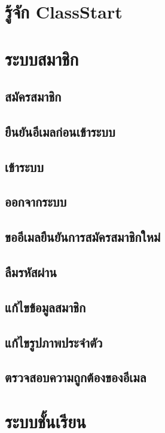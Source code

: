 \documentclass[12pt,oneside]{book}
\begin{document}
\tableofcontents

\chapter{รู้จัก ClassStart}

\chapter{ระบบสมาชิก}

\section{สมัครสมาชิก}

\section{ยืนยันอีเมลก่อนเข้าระบบ}

\section{เข้าระบบ}

\section{ออกจากระบบ}

\section{ขออีเมลยืนยันการสมัครสมาชิกใหม่}

\section{ลืมรหัสผ่าน}

\section{แก้ไขข้อมูลสมาชิก}

\section{แก้ไขรูปภาพประจำตัว}

\section{ตรวจสอบความถูกต้องของอีเมล}

\chapter{ระบบชั้นเรียน}
\end{document}
